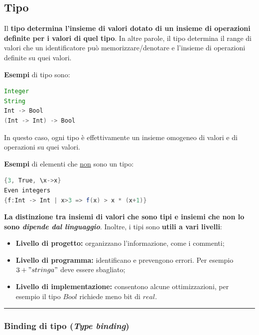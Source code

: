 \documentclass[a4paper]{article}
\newcommand{\longline}{\noindent\rule{\textwidth}{0.4pt}}
\begin{document}
	
	\subsection{Tipo}
	
	Il \textcolor{Red3}{\textbf{tipo}} \textbf{determina l'insieme di valori dotato di un insieme di operazioni definite per i valori di quel tipo}. In altre parole, il tipo determina il range di valori che un identificatore può memorizzare/denotare e l'insieme di operazioni definite su quei valori.\newline
	
	\noindent
	\textcolor{Green4}{\textbf{Esempi}} di tipo sono:
	\begin{lstlisting}[language=Java]
Integer
String
Int -> Bool
(Int -> Int) -> Bool\end{lstlisting}
	In questo caso, ogni tipo è effettivamente un insieme omogeneo di valori e di operazioni su quei valori.\newline
	
	\noindent
	\textcolor{Green4}{\textbf{Esempi}} di elementi che \underline{non} sono un tipo:
	\begin{lstlisting}[language=Java]
{3, True, \x->x}
Even integers
{f:Int -> Int | x>3 => f(x) > x * (x+1)}\end{lstlisting}\:\newline

	\noindent
	\textbf{La distinzione tra insiemi di valori che sono tipi e insiemi che non lo sono \emph{dipende dal linguaggio}}. Inoltre, i tipi sono \textbf{utili a vari livelli}:
	\begin{itemize}
		\item \textbf{Livello di progetto:} organizzano l'informazione, come i commenti;
		
		\item \textbf{Livello di programma:} identificano e prevengono errori. Per esempio $3+"stringa"$ deve essere sbagliato;
		
		\item \textbf{Livello di implementazione:} consentono alcune ottimizzazioni, per esempio il tipo $Bool$ richiede meno bit di $real$.
	\end{itemize}

	\longline
	
	\subsubsection{Binding di tipo (\emph{Type binding})}
	
\end{document}
